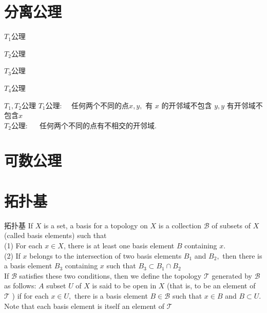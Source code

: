 \chapter{分离公理}
\begin{introduction}
	\item $T_1$公理
	\item $T_2$公理
	\item $T_3$公理
	\item $T_4$公理
\end{introduction}
\begin{definition}{$T_{1},T_{2}$公理}
\noindent $T_{1}$公理:$\quad$ 任何两个不同的点$x, y,$ 有 $x$ 的开邻域不包含 $y, y$ 有开邻域不包含$x$\\
$T_{2}$公理: $\quad$ 任何两个不同的点有不相交的开邻域.
\end{definition}

\chapter{可数公理}
\chapter{拓扑基}
\begin{definition}{拓扑基}
\noindent If $X$ is a set, a basis for a topology on $X$ is a collection $\mathscr{B}$ of subsets of $X$ (called basis elements) such that\\
(1) For each $x \in X$, there is at least one basis element $B$ containing $x$.\\
(2) If $x$ belongs to the intersection of two basis elements $B_{1}$ and $B_{2},$ then there is a basis element $B_{3}$ containing $x$ such that $B_{3} \subset B_{1} \cap B_{2}$ \\
If $\mathscr{B}$ satisfies these two conditions, then we define the topology $\boldsymbol{\mathcal { T }}$ generated by $\mathcal{B}$ as follows: $A$ subset $U$ of $X$ is said to be open in $X$ (that is, to be an element of $\mathcal{T}$ ) if for each $x \in U,$ there is a basis element $B \in \mathscr{B}$ such that $x \in B$ and $B \subset U .$ Note that each basis element is itself an element of $\mathcal{T}$
\end{definition}